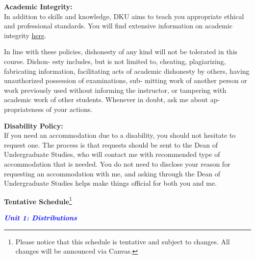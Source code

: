 \documentclass[11pt]{article}
\begin{document}
\vspace{0.5cm}
\large \textbf{Academic Integrity:}\\[0.5em]
In addition to skills and knowledge, DKU aims to teach you appropriate ethical and professional standards. You will find extensive information on academic integrity \href{https://ugstudies.dukekunshan.edu.cn/academic-integrity/}{here}.

In line with these policies, dishonesty of any kind will not be tolerated in this course. Dishon- esty includes, but is not limited to, cheating, plagiarizing, fabricating information, facilitating acts of academic dishonesty by others, having unauthorized possession of examinations, sub- mitting work of another person or work previously used without informing the instructor, or tampering with academic work of other students. Whenever in doubt, ask me about ap- propriateness of your actions.

\vspace{0.5cm}
\large \textbf{Disability Policy:}\\[0.5em]
If you need an accommodation due to a disability, you should not hesitate to request one. The process is that requests should be sent to the Dean of Undergraduate Studies, who will contact me with recommended type of accommodation that is needed. You do not need to disclose your reason for requesting an accommodation with me, and asking through the Dean of Undergraduate Studies helps make things official for both you and me.







\newpage
\Large \begin{center}
\textbf{Tentative Schedule}\footnote{Please notice that this schedule is tentative and subject to changes. All changes will be announced via Canvas.}
\end{center}

\Large \textcolor{blue}{\textit{\textbf{Unit 1: Distributions}}} \\
\end{document}
